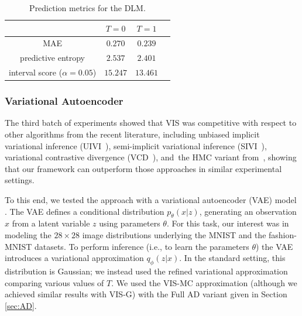 \begin{table}[!h]
\centering
\caption{Prediction metrics for the DLM.}\label{tbl:preds_dlm}
\begin{tabular}{c@{\hskip 1.1in}c@{\hskip 1in}c@{\hskip 1in}c}
\toprule
   & ${T=0}$                             & ${T=1}$   \\ 
 \midrule
    MAE          & $0.270$ &  $0.239$ \\

    predictive entropy          & $2.537$ &  $2.401$ \\
    interval score ($\alpha=0.05$) & $15.247$ & $13.461$\\
 \bottomrule
\end{tabular}
\end{table}

\subsubsection*{Variational Autoencoder}

The third batch of experiments showed that VIS 
was competitive with respect to other algorithms from the recent literature, including unbiased implicit variational inference (UIVI~\parencite{pmlr-v89-titsias19a}), semi-implicit variational inference (SIVI~\parencite{yin2018semi}),  variational contrastive divergence (VCD~\parencite{pmlr-v97-ruiz19a}), 
and~the HMC variant from~\parencite{hoffman2017learning}, showing that our framework can outperform those approaches in similar experimental settings. 

 To this end, we tested the approach with a variational autoencoder (VAE) model \parencite{kingma2013auto}. %
The VAE defines a conditional distribution $p_{\theta}(x | z)$, generating an observation $x$ from a latent variable $z$ using {parameters $\theta$}. For this task, our interest 
was in modeling the $28 \times 28$ image distributions 
underlying the MNIST %
\parencite{MNIST} and the fashion-MNIST \parencite{xiao2017/online} datasets. To perform inference (i.e., to learn
the parameters $\theta$) the VAE introduces a variational approximation $q_{\phi}(z | x)$. In the standard setting, this distribution is Gaussian; we instead used the refined variational approximation comparing various values of $T$. We used the VIS-MC approximation (although we achieved similar results
with VIS-G) with the Full AD variant given in Section \ref{sec:AD}.

